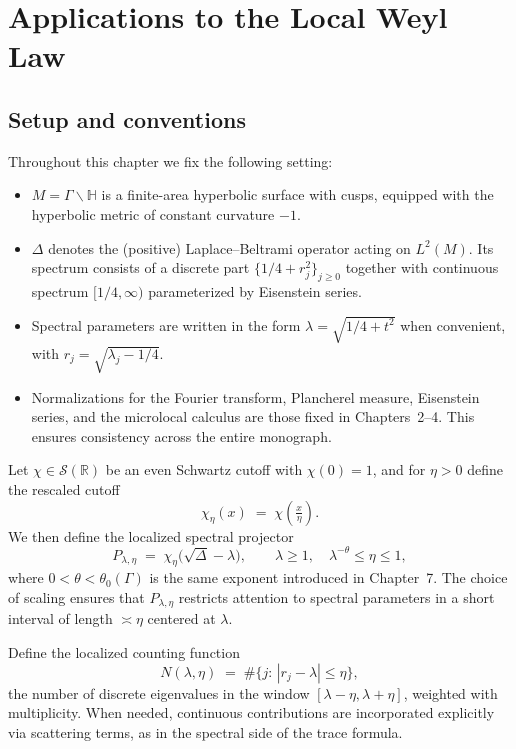 \section{Applications to the Local Weyl Law}\label{sec:apps-weyl}

\subsection{Setup and conventions}

Throughout this chapter we fix the following setting:

\begin{itemize}
\item $M=\Gamma\backslash\mathbb{H}$ is a finite-area hyperbolic surface with cusps, equipped with the hyperbolic metric of constant curvature $-1$.
\item $\Delta$ denotes the (positive) Laplace--Beltrami operator acting on $L^2(M)$. Its spectrum consists of a discrete part $\{1/4+r_j^2\}_{j\ge 0}$ together with continuous spectrum $[1/4,\infty)$ parameterized by Eisenstein series.
\item Spectral parameters are written in the form $\lambda = \sqrt{1/4+t^2}$ when convenient, with $r_j=\sqrt{\lambda_j-1/4}$.
\item Normalizations for the Fourier transform, Plancherel measure, Eisenstein series, and the microlocal calculus are those fixed in Chapters~2--4. This ensures consistency across the entire monograph.
\end{itemize}

Let $\chi\in\mathcal{S}(\mathbb{R})$ be an even Schwartz cutoff with $\chi(0)=1$, and for $\eta>0$ define the rescaled cutoff
\[
\chi_\eta(x) \;=\; \chi\!\left(\tfrac{x}{\eta}\right).
\]
We then define the localized spectral projector
\begin{equation}\label{eq:proj-def}
P_{\lambda,\eta} \;=\; \chi_\eta\!\big(\sqrt{\Delta}-\lambda\big),
\qquad \lambda\ge 1,\quad \lambda^{-\theta}\le \eta\le 1,
\end{equation}
where $0<\theta<\theta_0(\Gamma)$ is the same exponent introduced in Chapter~7. The choice of scaling ensures that $P_{\lambda,\eta}$ restricts attention to spectral parameters in a short interval of length $\asymp\eta$ centered at $\lambda$.

Define the localized counting function
\begin{equation}\label{eq:N-def}
N(\lambda,\eta)\;=\;\#\big\{j:\, |r_j-\lambda|\le \eta\big\},
\end{equation}
the number of discrete eigenvalues in the window $[\lambda-\eta,\lambda+\eta]$, weighted with multiplicity. When needed, continuous contributions are incorporated explicitly via scattering terms, as in the spectral side of the trace formula.

